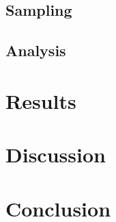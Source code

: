 \documentclass[
  authoryear,
  review,
  3p,
  twocolumn]{elsarticle}
\begin{document}
\hypertarget{sampling}{%
\subsection{Sampling}\label{sampling}}

\hypertarget{analysis}{%
\subsection{Analysis}\label{analysis}}

\hypertarget{results}{%
\section{Results}\label{results}}

\hypertarget{discussion}{%
\section{Discussion}\label{discussion}}

\hypertarget{conclusion}{%
\section{Conclusion}\label{conclusion}}

\newpage


\renewcommand\refname{References}
  
\end{document}
